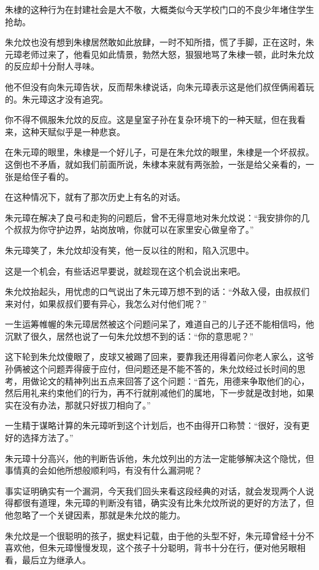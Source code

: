 \begin{multicols}{\theparacolNo}
		朱棣的这种行为在封建社会是大不敬，大概类似今天学校门口的不良少年堵住学生抢劫。

		朱允炆也没有想到朱棣居然敢如此放肆，一时不知所措，慌了手脚，正在这时，朱元璋老师过来了，他看见如此情景，勃然大怒，狠狠地骂了朱棣一顿，此时朱允炆的反应却十分耐人寻味。

		他不但没有向朱元璋告状，反而帮朱棣说话，向朱元璋表示这是他们叔侄俩闹着玩的。朱元璋这才没有追究。

		你不得不佩服朱允炆的反应。这是皇室子孙在复杂环境下的一种天赋，但在我看来，这种天赋似乎是一种悲哀。

		在朱元璋的眼里，朱棣是一个好儿子，可是在朱允炆的眼里，朱棣是一个坏叔叔。这倒也不矛盾，就如我们前面所说，朱棣本来就有两张脸，一张是给父亲看的，一张是给侄子看的。

		在这种情况下，就有了那次历史上有名的对话。

		朱元璋在解决了良弓和走狗的问题后，曾不无得意地对朱允炆说：“我安排你的几个叔叔为你守护边界，站岗放哨，你就可以在家里安心做皇帝了。”

		朱元璋笑了，朱允炆却没有笑，他一反以往的附和，陷入沉思中。

		这是一个机会，有些话迟早要说，就趁现在这个机会说出来吧。

		朱允炆抬起头，用忧虑的口气说出了朱元璋万想不到的话：“外敌入侵，由叔叔们来对付，如果叔叔们要有异心，我怎么对付他们呢？”

		一生运筹帷幄的朱元璋居然被这个问题问呆了，难道自己的儿子还不能相信吗，他沉默了很久，居然也说了一句朱允炆想不到的话：“你的意思呢？”

		这下轮到朱允炆傻眼了，皮球又被踢了回来，要靠我还用得着问你老人家么，这爷孙俩被这个问题弄得疲于应付，但问题还是不能不答的，朱允炆经过长时间的思考，用做论文的精神列出五点来回答了这个问题：“首先，用德来争取他们的心，然后用礼来约束他们的行为，再不行就削减他们的属地，下一步就是改封地，如果实在没有办法，那就只好拔刀相向了。”

		一生精于谋略计算的朱元璋听到这个计划后，也不由得开口称赞：“很好，没有更好的选择方法了。”

		朱元璋十分高兴，他的判断告诉他，朱允炆列出的方法一定能够解决这个隐忧，但事情真的会如他所想般顺利吗，有没有什么漏洞呢？

		事实证明确实有一个漏洞，今天我们回头来看这段经典的对话，就会发现两个人说得都很有道理，朱元璋的判断没有错，确实没有比朱允炆所说的更好的方法了，但他忽略了一个关键因素，那就是朱允炆的能力。

		朱允炆是一个很聪明的孩子，据史料记载，由于他的头型不好，朱元璋曾经十分不喜欢他，但朱元璋慢慢发现，这个孩子十分聪明，背书十分在行，便对他另眼相看，最后立为继承人。


\end{multicols}
